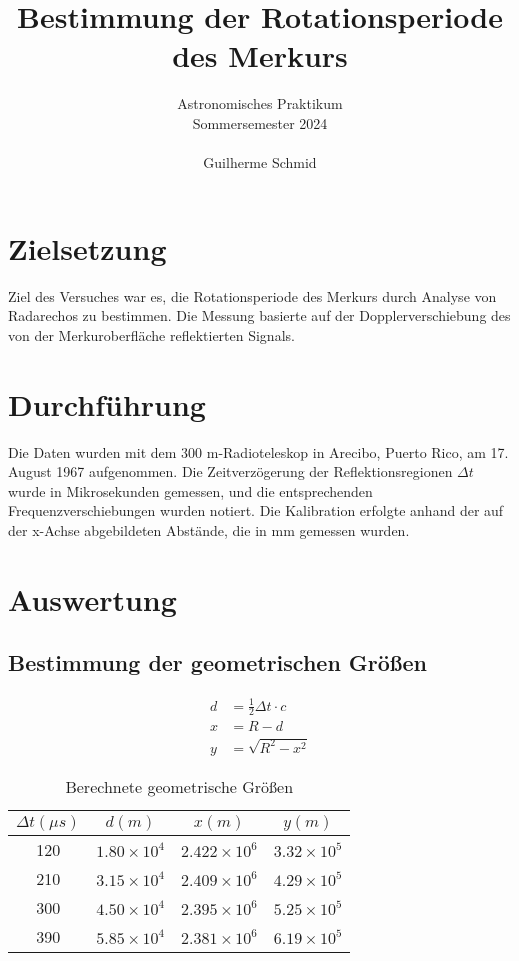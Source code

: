 \documentclass[a4paper,12pt]{article}
\title{Bestimmung der Rotationsperiode des Merkurs}
\author{Astronomisches Praktikum \\
Sommersemester 2024\\\\
Guilherme Schmid}
\date{}
\begin{document}
\maketitle

\section*{Zielsetzung}
Ziel des Versuches war es, die Rotationsperiode des Merkurs durch Analyse von Radarechos zu bestimmen. Die Messung basierte auf der Dopplerverschiebung des von der Merkuroberfläche reflektierten Signals.

\section*{Durchführung}
Die Daten wurden mit dem 300 m-Radioteleskop in Arecibo, Puerto Rico, am 17. August 1967 aufgenommen. Die Zeitverzögerung der Reflektionsregionen \(\Delta t\) wurde in Mikrosekunden gemessen, und die entsprechenden Frequenzverschiebungen wurden notiert. Die Kalibration erfolgte anhand der auf der x-Achse abgebildeten Abstände, die in mm gemessen wurden.

\section*{Auswertung}

\subsection*{Bestimmung der geometrischen Größen}
\begin{align*}
d &= \frac{1}{2} \Delta t \cdot c \\
x &= R - d \\
y &= \sqrt{R^2 - x^2}
\end{align*}

\begin{table}[H]
    \centering
    \begin{tabular}{cccc}
        \toprule
        \(\Delta t (\mu s)\) & \(d (m)\) & \(x (m)\) & \(y (m)\) \\
        \midrule
        120 & \(1.80 \times 10^4\) & \(2.422 \times 10^6\) & \(3.32 \times 10^5\) \\
        210 & \(3.15 \times 10^4\) & \(2.409 \times 10^6\) & \(4.29 \times 10^5\) \\
        300 & \(4.50 \times 10^4\) & \(2.395 \times 10^6\) & \(5.25 \times 10^5\) \\
        390 & \(5.85 \times 10^4\) & \(2.381 \times 10^6\) & \(6.19 \times 10^5\) \\
        \bottomrule
    \end{tabular}
    \caption{Berechnete geometrische Größen}
\end{table}
\end{document}

